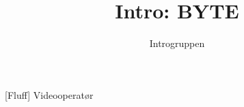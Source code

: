 \documentclass[a4paper,11pt]{article}
\title{Intro: BYTE}
\author{Introgruppen}
\begin{document}
\maketitle

\begin{roles}
[Fluff] Videooperatør
\end{roles}

\begin{sketch}

\end{sketch}
\end{document}
